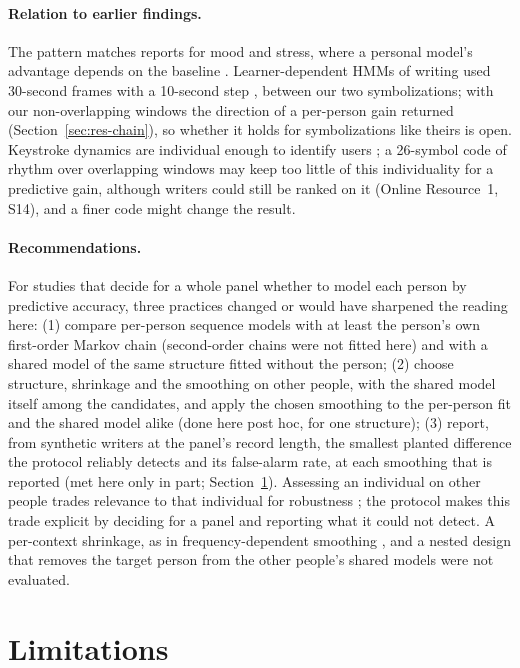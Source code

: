\documentclass[pdflatex,sn-basic]{sn-jnl}
\newcommand{\Sref}[1]{Online Resource~1, S#1}
\begin{document}
\paragraph{Relation to earlier findings.} The pattern matches reports for mood and stress, where a personal model's advantage depends on the baseline \citep{DeMasi2017,Aalbers2023,Leenaerts2024}. Learner-dependent HMMs of writing used 30-second frames with a 10-second step \citep{Uto2020}, between our two symbolizations; with our non-overlapping windows the direction of a per-person gain returned (Section~\ref{sec:res-chain}), so whether it holds for symbolizations like theirs is open. Keystroke dynamics are individual enough to identify users \citep{Monaco2018}; a 26-symbol code of rhythm over overlapping windows may keep too little of this individuality for a predictive gain, although writers could still be ranked on it (\Sref{14}), and a finer code might change the result.

\paragraph{Recommendations.} For studies that decide for a whole panel whether to model each person by predictive accuracy, three practices changed or would have sharpened the reading here:
(1) compare per-person sequence models with at least the person's own first-order Markov chain (second-order chains were not fitted here) and with a shared model of the same structure fitted without the person;
(2) choose structure, shrinkage and the smoothing on other people, with the shared model itself among the candidates, and apply the chosen smoothing to the per-person fit and the shared model alike (done here post hoc, for one structure);
(3) report, from synthetic writers at the panel's record length, the smallest planted difference the protocol reliably detects and its false-alarm rate, at each smoothing that is reported (met here only in part; Section~\ref{sec:limits}).
Assessing an individual on other people trades relevance to that individual for robustness \citep{LiuMeng2016}; the protocol makes this trade explicit by deciding for a panel and reporting what it could not detect. A per-context shrinkage, as in frequency-dependent smoothing \citep{Monaco2018}, and a nested design that removes the target person from the other people's shared models were not evaluated.

\section{Limitations}\label{sec:limits}
\end{document}
